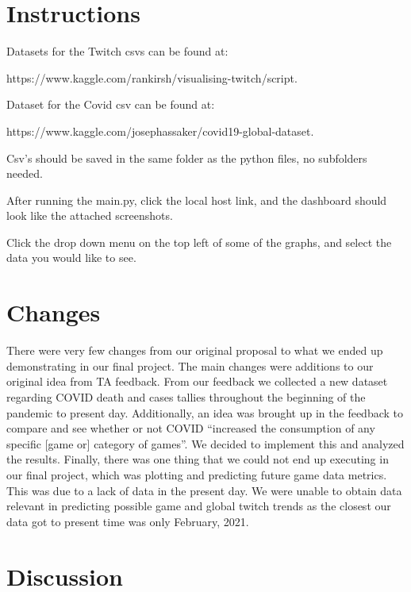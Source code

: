\documentclass[fontsize=11pt]{article}
\begin{document}
\newline\newline

\section*{Instructions}

Datasets for the Twitch csvs can be found at:

https://www.kaggle.com/rankirsh/visualising-twitch/script.

Dataset for the Covid csv can be found at:

https://www.kaggle.com/josephassaker/covid19-global-dataset.

Csv’s should be saved in the same folder as the python files, no subfolders needed.

After running the main.py, click the local host link, and the dashboard should look like the attached screenshots.

Click the drop down menu on the top left of some of the graphs, and select the data you would like to see.

\section*{Changes}

There were very few changes from our original proposal to what we ended up demonstrating in our final project. The main changes were additions to our original idea from TA feedback. From our feedback we collected a new dataset regarding COVID death and cases tallies throughout the beginning of the pandemic to present day. Additionally, an idea was brought up in the feedback to compare and see whether or not COVID “increased the consumption of any specific [game or] category of games”. We decided to implement this and analyzed the results.  Finally, there was one thing that we could not end up executing in our final project, which was plotting and predicting future game data metrics. This was due to a lack of data in the present day. We were unable to obtain data relevant in predicting possible game and global twitch trends as the closest our data got to present time was only February, 2021.

\section*{Discussion}
\end{document}
